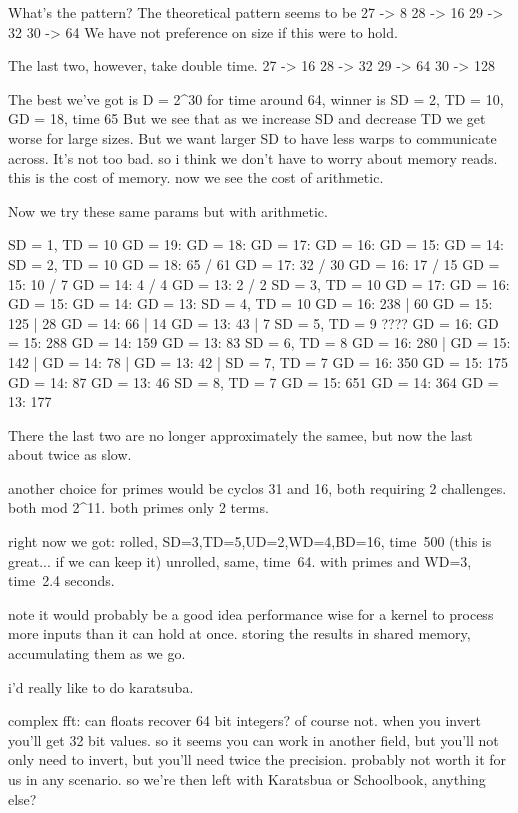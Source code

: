 What's the pattern?
The theoretical pattern seems to be
27 -> 8
28 -> 16
29 -> 32
30 -> 64
We have not preference on size if this were to hold.

The last two, however, take double time.
27 -> 16
28 -> 32
29 -> 64
30 -> 128

The best we've got is D = 2^30 for time around 64, winner is SD = 2, TD = 10, GD = 18, time 65
But we see that as we increase SD and decrease TD we get worse for large sizes.
But we want larger SD to have less warps to communicate across. 
It's not too bad. so i think we don't have to worry about memory reads. this is the cost of memory. now we see the cost of arithmetic. 

Now we try these same params but with arithmetic.

SD = 1, TD = 10
    GD = 19: 
    GD = 18: 
    GD = 17: 
    GD = 16: 
    GD = 15: 
    GD = 14: 
SD = 2, TD = 10
    GD = 18: 65 / 61
    GD = 17: 32 / 30
    GD = 16: 17 / 15
    GD = 15: 10 / 7
    GD = 14: 4 / 4
    GD = 13: 2 / 2
SD = 3, TD = 10
    GD = 17: 
    GD = 16: 
    GD = 15: 
    GD = 14: 
    GD = 13: 
SD = 4, TD = 10
    GD = 16: 238 | 60
    GD = 15: 125 | 28
    GD = 14: 66 | 14
    GD = 13: 43 | 7
SD = 5, TD = 9 ????
    GD = 16: 
    GD = 15: 288
    GD = 14: 159
    GD = 13: 83
SD = 6, TD = 8
    GD = 16: 280 |
    GD = 15: 142 | 
    GD = 14: 78 |
    GD = 13: 42 |
SD = 7, TD = 7
    GD = 16: 350
    GD = 15: 175
    GD = 14: 87
    GD = 13: 46
SD = 8, TD = 7
    GD = 15: 651
    GD = 14: 364
    GD = 13: 177

There the last two are no longer approximately the samee, but now the last about twice as slow.









another choice for primes would be cyclos 31 and 16, both requiring 2 challenges. both mod 2^11. both primes only 2 terms. 


right now we got:
rolled, SD=3,TD=5,UD=2,WD=4,BD=16, time~500 (this is great... if we can keep it)
unrolled, same, time~64. with primes and WD=3, time~2.4 seconds.

note it would probably be a good idea performance wise for a kernel to process more inputs than it can hold at once. storing the results in shared memory, accumulating them as we go. 


i'd really like to do karatsuba.


complex fft:
can floats recover 64 bit integers? of course not. when you invert you'll get 32 bit values.
so it seems you can work in another field, but you'll not only need to invert, but you'll need twice the precision. probably not worth it for us in any scenario.
so we're then left with Karatsbua or Schoolbook, anything else? 

